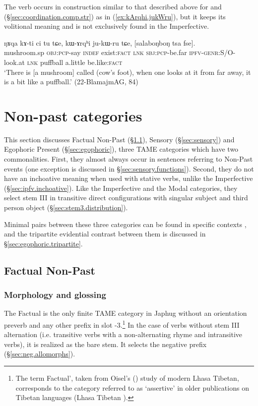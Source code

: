 The verb  occurs in construction similar to that described above for  and  (§\ref{sec:coordination.comp.str}) as in (\ref{ex:kArqhi.jukWru}), but it keeps its volitional meaning and is not exclusively found in the Imperfective.

\begin{exe}
\ex \label{ex:kArqhi.jukWru}
\gll ŋɤqa kɤ-ti ci tu tɕe, kɯ-ɤrqʰi ju-kɯ-ru tɕe, [salaboŋboŋ tsa fse].  \\
mushroom.sp \textsc{obj}:\textsc{pcp}-say \textsc{indef} exist:\textsc{fact} \textsc{lnk} \textsc{sbj}:\textsc{pcp}-be.far \textsc{ipfv}-\textsc{genr}:S/O-look.at \textsc{lnk} puffball a.little be.like:\textsc{fact} \\
\glt `There is [a mushroom] called  (cow's foot), when one looks at it from far away, it is a bit like a puffball.' (22-BlamajmAG, 84)
\end{exe}

\section{Non-past categories} \label{sec:TAME.npst}
This section discusses Factual Non-Past (§\ref{sec:factual}), Sensory (§\ref{sec:sensory}) and Egophoric Present (§\ref{sec:egophoric}), three TAME categories which have two commonalities. First, they almost always occur in sentences referring to Non-Past events (one exception is discussed in §\ref{sec:sensory.functions}). Second, they do not have an inchoative meaning when used with stative verbs, unlike the Imperfective (§\ref{sec:ipfv.inchoative}). Like the Imperfective and the Modal categories, they select stem III in transitive direct configurations with singular subject and third person object (§\ref{sec:stem3.distribution}).

Minimal pairs between these three categories can be found in specific contexts \citep{jacques19egophoric}, and the tripartite evidential contrast between them is discussed in §\ref{sec:egophoric.tripartite}.

\subsection{Factual Non-Past} \label{sec:factual}
\subsubsection{Morphology and glossing} \label{sec:fact.morphology}
The Factual is the only finite TAME category in Japhug without an orientation preverb and any other prefix in slot -3.\footnote{The term Factual', taken from Oisel's (\citeyear{oisel13aux}) study of modern Lhasa Tibetan, corresponds to the category referred to as `assertive' in older publications on Tibetan languages (Lhasa Tibetan ).} In the case of verbs without stem III alternation (i.e. transitive verbs with a non-alternating rhyme and intransitive verbs), it is realized as the bare stem. It selects the negative prefix  (§\ref{sec:neg.allomorphs}). 


